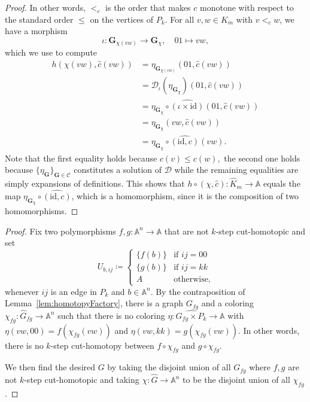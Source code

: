 \documentclass[oneside]{amsart}
\newcommand{\str}[1]{\mathbb{#1}}
\newcommand{\cat}[1]{\mathcal{#1}}
\begin{document}
\begin{proof}
    In other words, $<_c$ 
    is the order that makes $c$ monotone with respect to the standard order $\leq$ on the vertices of $P_k$.
    For all $v, w \in K_m$ with $v<_c w$, we have a morphism
    \begin{equation*}
    \iota\colon\mathbf{G}_{\chi(vw)} \to\mathbf{G}_\chi,\quad
    01\mapsto vw,
    \end{equation*}
    which we use to compute 
    \begin{align*}
    h(\chi(vw), \hat c(vw) ) &= 
    \eta_{\mathbf{G}_{\chi(vw)}}( 01, \hat{c}(vw))\\&=
    \cat D_\iota (\eta_{\mathbf{G}_{\chi}})( 01, \hat{c}(vw)) \\&= 
    \eta_{\mathbf{G}_\chi} \circ \widehat{(\iota\times\mathrm{id})}( 01, \hat{c}(vw)) \\&=
    \eta_{\mathbf{G}_{\chi}}( vw, \hat{c}(vw))\\&=
    \eta_{\mathbf{G}_\chi} \circ \widehat{(\mathrm{id},c)} (vw).
    \end{align*}
    Note that the first equality holds because $c(v) \leq c(w),$ the second one holds because $\{\eta_{\mathbf G}\}_{\mathbf G \in \cat C}$ constitutes a solution of $\cat D$ while the remaining equalities are simply expansions of definitions.
    This shows that $h\circ (\chi,\hat c)\colon\hat K_m \to \str A$ equals the map $\eta_{\mathbf{G}_\chi} \circ \widehat{(\mathrm{id},c)}$, 
    which is a homomorphism, since it is the composition of two homomorphisms.
\end{proof}

\propGadgetOne*

\begin{proof}
Fix two polymorphisms $f,g\colon \str A^n\to\str A$ that are not $k$-step cut-homotopic and set 
$$
U_{b,ij}\coloneq
\begin{cases}
    \{f(b)\} &\text{if } ij = 00\\
    \{g(b)\} &\text{if } ij = kk\\
    A &\text{otherwise,}
\end{cases}
$$
whenever $ij$ is an edge in $P_k$ and $b\in\str A^n$. By the contraposition of Lemma~\ref{lem:homotopyFactory}, there is a graph $G_{fg}$ and a coloring $\chi_{fg}\colon \hat G_{fg}\to\str A^n$ such that there is no coloring $\eta\colon \widehat{G_{fg}\times P_k}\to \str A$ with $\eta(vw,00) = f(\chi_{fg}(vw))$ and $\eta(vw,kk) = g(\chi_{fg}(vw))$. In other words, there is no $k$-step cut-homotopy between $f\circ\chi_{fg}$ and $g\circ \chi_{fg}$.

We then find the desired $G$ by taking the disjoint union of all $G_{fg}$ where $f,g$ are not $k$-step cut-homotopic and taking
$\chi\colon \hat G\to \str A^n$
to be the disjoint union of all $\chi_{fg}$. 
\end{proof}
\end{document}
